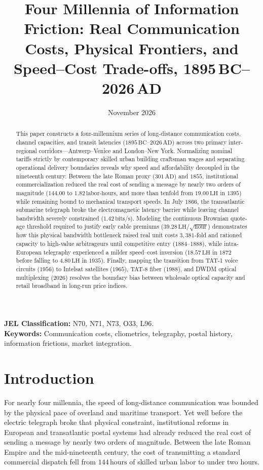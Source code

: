 \documentclass[11pt,a4paper]{article}
\title{\textbf{Four Millennia of Information Friction: Real Communication Costs, Physical Frontiers, and Speed--Cost Trade-offs, 1895\,BC--2026\,AD}}
\author{}
\date{November 2026}
\begin{document}
\maketitle

\begin{abstract}
This paper constructs a four-millennium series of long-distance communication costs, channel capacities, and transit latencies ($1895\,\text{BC}$--$2026\,\text{AD}$) across two primary inter-regional corridors---Antwerp--Venice and London--New York. Normalizing nominal tariffs strictly by contemporary skilled urban building craftsman wages and separating operational delivery boundaries reveals why speed and affordability decoupled in the nineteenth century. Between the late Roman proxy ($301\,\text{AD}$) and $1855$, institutional commercialization reduced the real cost of sending a message by nearly two orders of magnitude ($144.00$ to $1.82\,\text{labor-hours}$, and more than tenfold from $19.00\,\text{LH}$ in $1395$) while remaining bound to mechanical transport speeds. In July $1866$, the transatlantic submarine telegraph broke the electromagnetic latency barrier while leaving channel bandwidth severely constrained ($1.42\,\text{bits/s}$). Modeling the continuous Brownian quote-age threshold required to justify early cable premiums ($39.28\,\text{LH}/\sqrt{\text{hour}}$) demonstrates how this physical bandwidth bottleneck raised real unit costs $3,381$-fold and rationed capacity to high-value arbitrageurs until competitive entry ($1884$--$1888$), while intra-European telegraphy experienced a milder speed--cost inversion ($18.57\,\text{LH}$ in $1872$ before falling to $4.80\,\text{LH}$ in $1935$). Finally, mapping the transition from TAT-1 voice circuits ($1956$) to Intelsat satellites ($1965$), TAT-8 fiber ($1988$), and DWDM optical multiplexing ($2026$) resolves the boundary bias between wholesale optical capacity and retail broadband in long-run price indices.
\end{abstract}

\noindent\textbf{JEL Classification:} N70, N71, N73, O33, L96.\\
\textbf{Keywords:} Communication costs, cliometrics, telegraphy, postal history, information frictions, market integration.

\section{Introduction}
\label{sec:introduction}

For nearly four millennia, the speed of long-distance communication was bounded by the physical pace of overland and maritime transport. Yet well before the electric telegraph broke that physical constraint, institutional reforms in European and transatlantic postal systems had already reduced the real cost of sending a message by nearly two orders of magnitude. Between the late Roman Empire and the mid-nineteenth century, the cost of transmitting a standard commercial dispatch fell from $144\,\text{hours}$ of skilled urban labor to under two hours.
\end{document}
